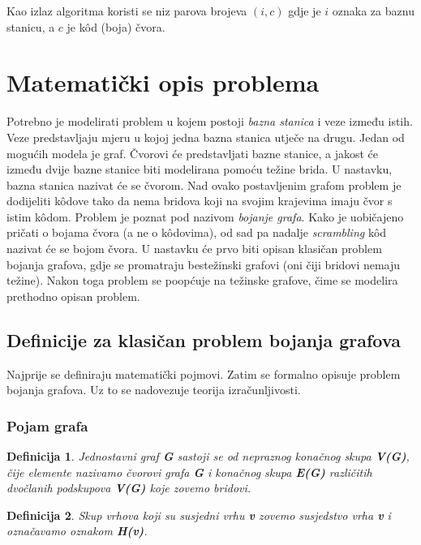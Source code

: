 \documentclass[times, utf8, diplomski, numeric]{fer}
\newtheorem{definition}{Definicija}
\begin{document}
Kao izlaz algoritma koristi se niz parova brojeva $(i, c)$ gdje je $i$ oznaka za baznu stanicu, a $c$ je k\^{o}d (boja) čvora.

\section{Matematički opis problema}

Potrebno je modelirati problem u kojem postoji \emph{bazna stanica} i veze između istih. Veze predstavljaju mjeru u kojoj jedna bazna stanica utječe na drugu. Jedan od mogućih modela je graf. Čvorovi će predstavljati bazne stanice, a jakost će između dvije bazne stanice biti modelirana pomoću težine brida. U nastavku, bazna stanica nazivat će se čvorom. Nad ovako postavljenim grafom problem je dodijeliti k\^{o}dove tako da nema bridova koji na svojim krajevima imaju čvor s istim k\^{o}dom. Problem je poznat pod nazivom \emph{bojanje grafa}. Kako je uobičajeno pričati o bojama čvora (a ne o k\^{o}dovima), od sad pa nadalje \emph{scrambling} k\^{o}d nazivat će se bojom čvora. U nastavku će prvo biti opisan klasičan problem bojanja grafova, gdje se promatraju bestežinski grafovi (oni čiji bridovi nemaju težine). Nakon toga problem se poopćuje na težinske grafove, čime se modelira prethodno opisan problem.

\subsection{Definicije za klasičan problem bojanja grafova}

Najprije se definiraju matematički pojmovi. Zatim se formalno opisuje problem bojanja grafova. Uz to se nadovezuje teorija izračunljivosti.

\subsubsection{Pojam grafa}

\begin{definition}
Jednostavni graf \textbf{G} sastoji se od nepraznog konačnog skupa \textbf{V(G)}, čije elemente nazivamo čvorovi grafa \textbf{G} i konačnog skupa \textbf{E(G)} različitih dvočlanih podskupova \textbf{V(G)} koje zovemo bridovi.
\end{definition}

\begin{definition}
Skup vrhova koji su susjedni vrhu \textbf{v} zovemo susjedstvo vrha \textbf{v} i označavamo oznakom \textbf{H(v)}.
\end{definition}
\end{document}
